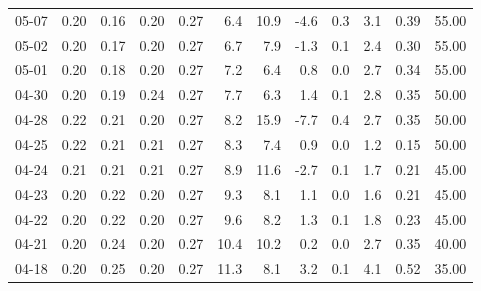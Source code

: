 \begin{threeparttable}
{\begin{tabular}{lrrrrrrrrrrr}
  05-07 &          0.20 &          0.16 &          0.20 &        0.27 &                 6.4 &                10.9 &       -4.6 &                 0.3 &              3.1 &            0.39 &                  55.00 \\
  05-02 &          0.20 &          0.17 &          0.20 &        0.27 &                 6.7 &                 7.9 &       -1.3 &                 0.1 &              2.4 &            0.30 &                  55.00 \\
  05-01 &          0.20 &          0.18 &          0.20 &        0.27 &                 7.2 &                 6.4 &        0.8 &                 0.0 &              2.7 &            0.34 &                  55.00 \\
  04-30 &          0.20 &          0.19 &          0.24 &        0.27 &                 7.7 &                 6.3 &        1.4 &                 0.1 &              2.8 &            0.35 &                  50.00 \\
  04-28 &          0.22 &          0.21 &          0.20 &        0.27 &                 8.2 &                15.9 &       -7.7 &                 0.4 &              2.7 &            0.35 &                  50.00 \\
  04-25 &          0.22 &          0.21 &          0.21 &        0.27 &                 8.3 &                 7.4 &        0.9 &                 0.0 &              1.2 &            0.15 &                  50.00 \\
  04-24 &          0.21 &          0.21 &          0.21 &        0.27 &                 8.9 &                11.6 &       -2.7 &                 0.1 &              1.7 &            0.21 &                  45.00 \\
  04-23 &          0.20 &          0.22 &          0.20 &        0.27 &                 9.3 &                 8.1 &        1.1 &                 0.0 &              1.6 &            0.21 &                  45.00 \\
  04-22 &          0.20 &          0.22 &          0.20 &        0.27 &                 9.6 &                 8.2 &        1.3 &                 0.1 &              1.8 &            0.23 &                  45.00 \\
  04-21 &          0.20 &          0.24 &          0.20 &        0.27 &                10.4 &                10.2 &        0.2 &                 0.0 &              2.7 &            0.35 &                  40.00 \\
  04-18 &          0.20 &          0.25 &          0.20 &        0.27 &                11.3 &                 8.1 &        3.2 &                 0.1 &              4.1 &            0.52 &                  35.00 \\

\end{tabular}}
\end{threeparttable}

